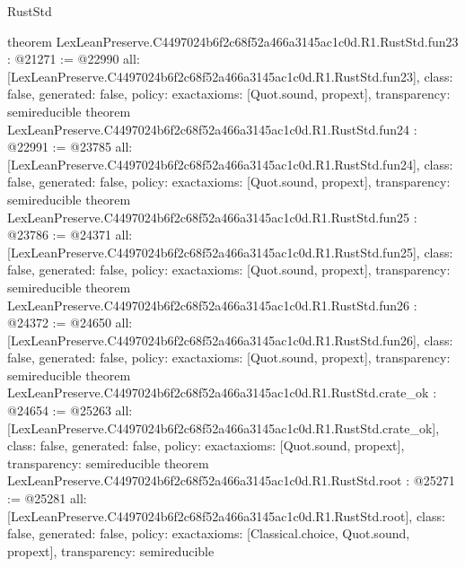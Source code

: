 \begin{lexlean}{RustStd}
\begin{coremodule}
{}
theorem LexLeanPreserve.C4497024b6f2c68f52a466a3145ac1c0d.R1.RustStd.fun23 : @21271 := @22990 {
  all: [LexLeanPreserve.C4497024b6f2c68f52a466a3145ac1c0d.R1.RustStd.fun23],
  class: false,
  generated: false,
  policy: exact{axioms: [Quot.sound, propext]},
  transparency: semireducible
}
theorem LexLeanPreserve.C4497024b6f2c68f52a466a3145ac1c0d.R1.RustStd.fun24 : @22991 := @23785 {
  all: [LexLeanPreserve.C4497024b6f2c68f52a466a3145ac1c0d.R1.RustStd.fun24],
  class: false,
  generated: false,
  policy: exact{axioms: [Quot.sound, propext]},
  transparency: semireducible
}
theorem LexLeanPreserve.C4497024b6f2c68f52a466a3145ac1c0d.R1.RustStd.fun25 : @23786 := @24371 {
  all: [LexLeanPreserve.C4497024b6f2c68f52a466a3145ac1c0d.R1.RustStd.fun25],
  class: false,
  generated: false,
  policy: exact{axioms: [Quot.sound, propext]},
  transparency: semireducible
}
theorem LexLeanPreserve.C4497024b6f2c68f52a466a3145ac1c0d.R1.RustStd.fun26 : @24372 := @24650 {
  all: [LexLeanPreserve.C4497024b6f2c68f52a466a3145ac1c0d.R1.RustStd.fun26],
  class: false,
  generated: false,
  policy: exact{axioms: [Quot.sound, propext]},
  transparency: semireducible
}
theorem LexLeanPreserve.C4497024b6f2c68f52a466a3145ac1c0d.R1.RustStd.crate_ok : @24654 := @25263 {
  all: [LexLeanPreserve.C4497024b6f2c68f52a466a3145ac1c0d.R1.RustStd.crate_ok],
  class: false,
  generated: false,
  policy: exact{axioms: [Quot.sound, propext]},
  transparency: semireducible
}
theorem LexLeanPreserve.C4497024b6f2c68f52a466a3145ac1c0d.R1.RustStd.root : @25271 := @25281 {
  all: [LexLeanPreserve.C4497024b6f2c68f52a466a3145ac1c0d.R1.RustStd.root],
  class: false,
  generated: false,
  policy: exact{axioms: [Classical.choice, Quot.sound, propext]},
  transparency: semireducible
}


\end{coremodule}
\end{lexlean}
